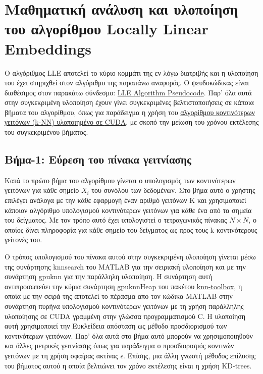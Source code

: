 \section{Μαθηματική ανάλυση και υλοποίηση του αλγορίθμου \textlatin{Locally Linear Embeddings}}
\par
Ο αλγόριθμος \textlatin{LLE}\cite{lle} αποτελεί το κύριο κομμάτι της εν λόγω διατριβής και η υλοποίηση του έχει στηριχθεί στον αλγόριθμο της παραπάνω αναφοράς. Ο ψευδοκώδικας είναι διαθέσιμος στον παρακάτω σύνδεσμο: \href{https://www.cs.nyu.edu/~roweis/lle/algorithm.html}{\textlatin{LLE Algorithm Pseudocode}}. Παρ' όλα αυτά στην συγκεκριμένη υλοποίηση έχουν γίνει συγκεκριμένες βελτιστοποιήσεις σε κάποια βήματα του αλγορίθμου, όπως για παράδειγμα η χρήση του \href{http://autogpu.ee.auth.gr/doku.php?id=cuknns:gpu_accelerated_k-nearest_neighbor_library}{αλγορίθμου κοντινότερων γειτόνων \textlatin{(k-NN)} υλοποιημένο σε \textlatin{CUDA}}, με σκοπό την μείωση του χρόνου εκτέλεσης του συγκεκριμένου βήματος. 

\subsection{Βήμα-1: Εύρεση του πίνακα γειτνίασης}
\par
Κατά το πρώτο βήμα του αλγορίθμου γίνεται ο υπολογισμός των κοντινότερων γειτόνων για κάθε σημείο $X_{i}$ του συνόλου των δεδομένων. Στο βήμα αυτό ο χρήστης επιλέγει ανάλογα με την κάθε εφαρμογή έναν αριθμό γειτόνων \textlatin{K} και χρησιμοποιεί κάποιον αλγόριθμο υπολογισμού κοντινότερων γειτόνων για κάθε ένα από τα σημεία του δείγματος. Με τον τρόπο αυτό έχει υπολογιστεί ο τετραγωνικός πίνακας $N \times N$, ο οποίος δίνει πληροφορία για κάθε σημείο του δείγματος ως προς τους \textlatin{k} κοντινότερους γείτονές του.
\par
Ο τρόπος υπολογισμού του πίνακα αυτού στην συγκεκριμένη υλοποίηση γίνεται μέσω της συνάρτησης \textlatin{knnsearch} του \textlatin{MATLAB} για την σειριακή υλοποίηση και με την συνάρτηση \textlatin{gpu\textunderscore knn} για την παράλληλη υλοποίηση. Η συνάρτηση αυτή αντιπροσωπεύει την κύρια συνάρτηση \textlatin{gpuknnHeap} του πακέτου \href{http://autogpu.ee.auth.gr/doku.php?id=cuknns:gpu_accelerated_k-nearest_neighbor_library}{\textlatin{knn-toolbox}}, η οποία με την σειρά της αποτελεί το πέρασμα απο τον κώδικα \textlatin{MATLAB} στην συνάρτηση πυρήνα υπολογισμού κοντινότερων γειτόνων με τη χρήση παράλληλης υλοποίησης σε \textlatin{CUDA} γραμμένη στην γλώσσα προγραμματισμού \textlatin{C}. Η υλοποίηση αυτή χρησιμοποιεί την Ευκλείδεια απόσταση ως μέθοδο προσδιορισμού των κοντινότερων γειτόνων. Παρ' όλα αυτά στο βήμα αυτό μπορούν να χρησιμοποιηθούν και άλλες μετρικές γειτνίασης όπως για παράδειγμα ο προσδιορισμός κοντινών γειτόνων με τη χρήση σφαίρας ακτίνας $\epsilon$. Επίσης, μια άλλη γνωστή μέθοδος επίλυσης του βήματος αυτού η οποία βελτιώνει τον χρόνο εκτέλεσης είναι η χρήση %
{\textlatin{KD-trees}}.


